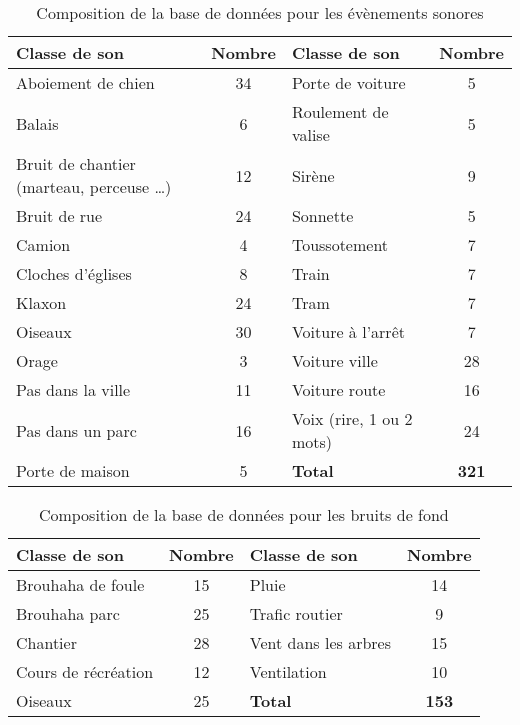 \begin{table}[h]
\centering
\begin{tabular}{m{5cm} c |m{5cm} c}
\hline
\toprule
\textbf{Classe de son} & \textbf{Nombre} & \textbf{Classe de son} & \textbf{Nombre} \\
\midrule
Aboiement de chien & 34 & Porte de voiture & 5\\ 
\rowcolor[HTML]{C0C0C0}
Balais & 6 & Roulement de valise & 5 \\ 
Bruit de chantier (marteau, perceuse \dots) & 12 & Sirène & 9 \\ 
\rowcolor[HTML]{C0C0C0}
Bruit de rue & 24 & Sonnette & 5 \\ 
Camion & 4 & Toussotement & 7\\ 
\rowcolor[HTML]{C0C0C0}
Cloches d'églises & 8 & Train & 7 \\ 
Klaxon & 24 & Tram & 7 \\
\rowcolor[HTML]{C0C0C0}
Oiseaux & 30 & Voiture à l'arrêt & 7 \\ 
Orage & 3 & Voiture ville & 28 \\ 
\rowcolor[HTML]{C0C0C0}
Pas dans la ville & 11 & Voiture route & 16 \\ 
Pas dans un parc & 16 & Voix (rire, 1 ou 2 mots) & 24 \\
\rowcolor[HTML]{C0C0C0}
Porte de maison & 5 &  \textbf{Total} & \textbf{321}\\ 
\bottomrule
\end{tabular}
\caption{Composition de la base de données pour les évènements sonores}
\label{tab:dataBaseEv}
\end{table}

\begin{table}[h]
\centering
\begin{tabular}{m{5cm} c |m{5cm} c}
\toprule
\textbf{Classe de son} & \textbf{Nombre} & \textbf{Classe de son} & \textbf{Nombre} \\ \midrule
Brouhaha de foule & 15 & Pluie & 14 \\ 
\rowcolor[HTML]{C0C0C0}
Brouhaha parc & 25 & Trafic routier & 9 \\
Chantier & 28 & Vent dans les arbres & 15 \\ 
\rowcolor[HTML]{C0C0C0}
Cours de récréation & 12 & Ventilation & 10 \\ 
Oiseaux & 25 & \textbf{Total} & \textbf{153} \\ 
\bottomrule
\end{tabular}
\caption{Composition de la base de données pour les bruits de fond}
\label{tab:dataBaseBcg}
\end{table}
